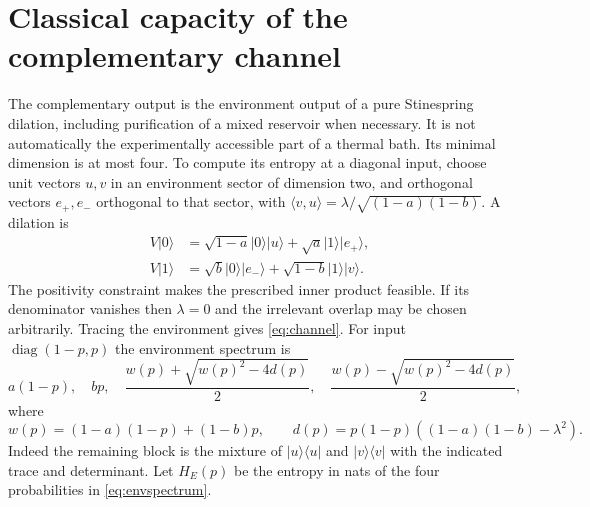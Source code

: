 \documentclass[11pt]{article}
\begin{document}
\section{Classical capacity of the complementary channel}\label{sec:complement}
The complementary output is the environment output of a pure Stinespring
dilation, including purification of a mixed reservoir when necessary. It is
not automatically the experimentally accessible part of a thermal bath.
Its minimal dimension is at most four. To compute its entropy at a diagonal
input, choose unit vectors $u,v$ in an environment sector of dimension two,
and orthogonal vectors $e_+,e_-$ orthogonal to that sector, with
$\langle v,u\rangle=\lambda/\sqrt{(1-a)(1-b)}$. A dilation is
\begin{align*}
 V|0\rangle&=\sqrt{1-a}|0\rangle|u\rangle+
                         \sqrt a|1\rangle|e_+\rangle,\\
 V|1\rangle&=\sqrt b|0\rangle|e_-\rangle+
                         \sqrt{1-b}|1\rangle|v\rangle.
\end{align*}
The positivity constraint makes the prescribed inner product feasible.
If its denominator vanishes then $\lambda=0$ and the irrelevant overlap may
be chosen arbitrarily. Tracing the environment gives \eqref{eq:channel}.
For input $\operatorname{diag}(1-p,p)$ the environment spectrum is
\begin{equation}\label{eq:envspectrum}
 a(1-p),\quad bp,\quad
 \frac{w(p)+\sqrt{w(p)^2-4d(p)}}2,\quad
 \frac{w(p)-\sqrt{w(p)^2-4d(p)}}2,
\end{equation}
where
\[
 w(p)=(1-a)(1-p)+(1-b)p,\qquad
 d(p)=p(1-p)((1-a)(1-b)-\lambda^2).
\]
Indeed the remaining block is the mixture of $|u\rangle\langle u|$ and
$|v\rangle\langle v|$ with the indicated trace and determinant. Let $H_E(p)$
be the entropy in nats of the four probabilities in \eqref{eq:envspectrum}.
\end{document}
